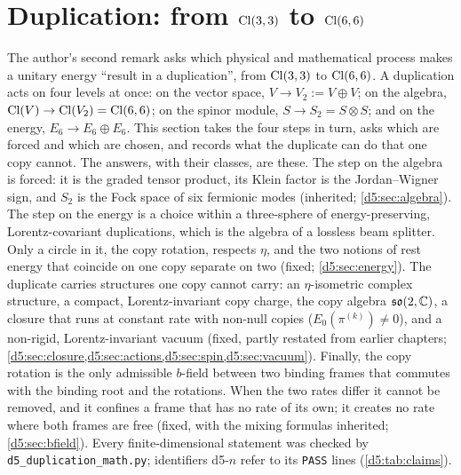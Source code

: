 
\section{\texorpdfstring{Duplication: from $\mathrm{Cl}(3,3)$ to $\mathrm{Cl}(6,6)$}{Duplication: from Cl(3,3) to Cl(6,6)}}
\label{d5:sec:main}

The author's second remark asks which physical and mathematical process makes a unitary energy ``result in a duplication'', from
$\mathrm{Cl}(3,3)$ to $\mathrm{Cl}(6,6)$. A duplication acts on four levels at once: on the vector space, $V\to V_2:=V\oplus V$; on the algebra,
$\mathrm{Cl}(V)\to\mathrm{Cl}(V_2)=\mathrm{Cl}(6,6)$; on the spinor module, $S\to S_2=S\otimes S$; and on the energy, $E_6\to E_6\oplus E_6$. This section takes
the four steps in turn, asks which are forced and which are chosen, and records what the duplicate can do that one copy cannot. The
answers, with their classes, are these. The step on the algebra is forced: it is the graded tensor product, its Klein factor is the
Jordan--Wigner sign, and $S_2$ is the Fock space of six fermionic modes (inherited; \cref{d5:sec:algebra}). The step on the energy is a
choice within a three-sphere of energy-preserving, Lorentz-covariant duplications, which is the algebra of a lossless beam splitter. Only a
circle in it, the copy rotation, respects $\eta$, and the two notions of rest energy that coincide on one copy separate on two (fixed;
\cref{d5:sec:energy}). The duplicate carries structures one copy cannot carry: an $\eta$-isometric complex structure, a compact,
Lorentz-invariant copy charge, the copy algebra $\mathfrak{so}(2,\mathbb{C})$, a closure that runs at constant rate with non-null copies ($E_0(\pi^{(k)})\neq0$), and a non-rigid,
Lorentz-invariant vacuum (fixed, partly restated from earlier chapters; \cref{d5:sec:closure,d5:sec:actions,d5:sec:spin,d5:sec:vacuum}). Finally, the
copy rotation is the only admissible $b$-field between two binding frames that commutes with the binding root and the rotations. When
the two rates differ it cannot be removed, and it confines a frame that has no rate of its own; it creates no rate where both frames
are free (fixed, with the mixing formulas inherited; \cref{d5:sec:bfield}). Every finite-dimensional statement was checked by
\texttt{d5\_duplication\_math.py}; identifiers d5-$n$ refer to its \texttt{PASS} lines (\cref{d5:tab:claims}).


